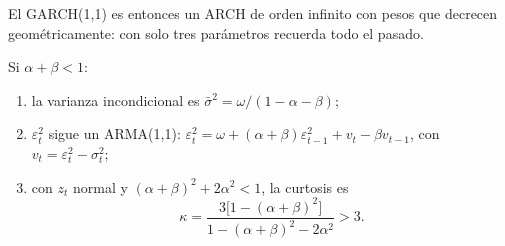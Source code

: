 El GARCH(1,1) es entonces un ARCH de orden infinito con pesos que decrecen geométricamente: con solo tres
parámetros recuerda todo el pasado.

\begin{proposicion}\label{prop:garchmom}
Si $\alpha+\beta<1$:
\begin{enumerate}[label=(\roman*)]
  \item la varianza incondicional es $\bar\sigma^2=\omega/(1-\alpha-\beta)$;
  \item $\varepsilon_t^2$ sigue un ARMA(1,1):
        $\varepsilon_t^2=\omega+(\alpha+\beta)\varepsilon_{t-1}^2+v_t-\beta v_{t-1}$, con
        $v_t=\varepsilon_t^2-\sigma_t^2$;
  \item con $z_t$ normal y $(\alpha+\beta)^2+2\alpha^2<1$, la curtosis es
        \[
          \kappa=\frac{3\bigl[1-(\alpha+\beta)^2\bigr]}{1-(\alpha+\beta)^2-2\alpha^2}>3 .
        \]
\end{enumerate}
\end{proposicion}

